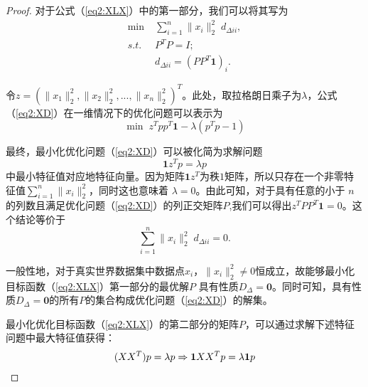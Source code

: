 \begin{proof}
对于公式（\ref{eq2:XLX}）中的第一部分，我们可以将其写为
\begin{equation}
	\begin{split}
		\mathop{\mathrm{min}}\;&\sum_{i=1}^{n} \|x_i\|_2^2\;d_{\Delta ii},\\
		s.t. \;\; &P^TP=I;\\
		&d_{\Delta ii}=(PP^T\textbf{1})_i.
	\end{split}
	\label{eq2:XD}
\end{equation}

令$z=(\|x_1\|_2^2, \|x_2\|_2^2, ... , \|x_n\|_2^2)^T$。此处，取拉格朗日乘子为$\lambda$，公式（\ref{eq2:XD}）在一维情况下的优化问题可以表示为
\begin{equation}
	\mathop{\mathrm{min}}\; z^Tpp^T\textbf{1}-\lambda (p^Tp-1)
\end{equation}

最终，最小化优化问题（\ref{eq2:XD}）可以被化简为求解问题
\begin{equation}
	\textbf{1}z^Tp=\lambda p
\end{equation}
中最小特征值对应地特征向量。因为矩阵$\textbf{1}z^T$为秩$1$矩阵，所以只存在一个非零特征值$\sum_{i=1}^{n}\|x_i\|_2^2$，同时这也意味着 $\lambda = 0$。由此可知，对于具有任意的小于 $n$的列数且满足优化问题（\ref{eq2:XD}）的列正交矩阵$P$,我们可以得出$z^TPP^T\textbf{1}=0$。这个结论等价于
\begin{equation}
	\sum_{i=1}^{n} \|x_i\|_2^2\;d_{\Delta ii} = 0.
\end{equation}

一般性地，对于真实世界数据集中数据点$x_i$，$\|x_i\|_2^2\neq0$恒成立，故能够最小化目标函数（\ref{eq2:XLX}）第一部分的最优解$P$ 具有性质$D_\Delta = \textbf{0}$。同时可知，具有性质$D_\Delta = \textbf{0}$的所有$P$的集合构成优化问题（\ref{eq2:XD}）的解集。

最小化优化目标函数（\ref{eq2:XLX}）的第二部分的矩阵$P$，可以通过求解下述特征问题中最大特征值获得：
\begin{equation}
	\begin{split}
		(XX^T)p = \lambda p
		\Rightarrow {\bf1}XX^Tp = \lambda {\bf1}p
	\end{split}
	\label{eq2:Solu}
\end{equation}


\end{proof}
